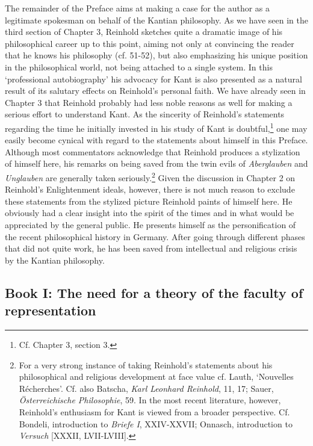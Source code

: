  The remainder of the Preface aims at making a case for the author as a legitimate spokesman on behalf of the Kantian philosophy. As we have seen in the third section of Chapter 3, Reinhold sketches quite a dramatic image of his philosophical career up to this point, aiming not only at convincing the reader that he knows his philosophy (cf. 51{-}52), but also emphasizing his unique position in the philosophical world, not being attached to a single system. In this `professional autobiography' his advocacy for Kant is also presented as a natural result of its salutary effects on Reinhold's personal faith. We have already seen in Chapter 3 that Reinhold probably had less noble reasons as well for making a serious effort to understand Kant. As the sincerity of Reinhold's statements regarding the time he initially invested in his study of Kant is doubtful,\footnote{ Cf. Chapter 3, section 3. } one may easily become cynical with regard to the statements about himself in this Preface. Although most commentators acknowledge that Reinhold produces a stylization of himself here, his remarks on being saved from the twin evils of \textit{Aberglauben }and \textit{Unglauben} are generally taken seriously.\footnote{ For a very strong instance of taking Reinhold's statements about his philosophical and religious development at face value cf. Lauth, `Nouvelles R\'{e}cherches'. Cf. also Batscha, \textit{Karl Leonhard Reinhold}, 11, 17; Sauer, \textit{\"{O}sterreichische Philosophie}, 59. In the most recent literature, however, Reinhold's enthusiasm for Kant is viewed from a broader perspective. Cf. Bondeli, introduction to \textit{Briefe I}, XXIV{-}XXVII; Onnasch, introduction to \textit{Versuch} [XXXII, LVII{-}LVIII]. } Given the discussion in Chapter 2 on Reinhold's Enlightenment ideals, however, there is not much reason to exclude these statements from the stylized picture Reinhold paints of himself here. He obviously had a clear insight into the spirit of the times and in what would be appreciated by the general public. He presents himself as the personification of the recent philosophical history in Germany. After going through different phases that did not quite work, he has been saved from intellectual and religious crisis by the Kantian philosophy. 


\subsection{Book I: The need for a theory of the faculty of representation}


